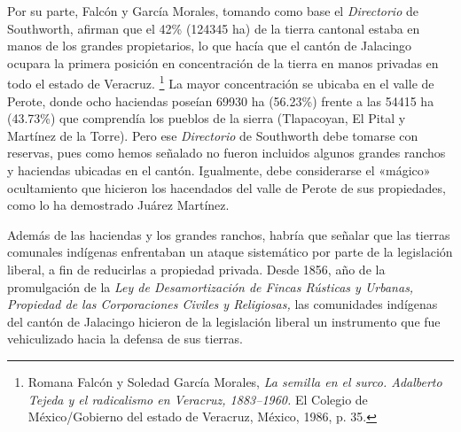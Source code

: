 \documentclass[14pt,twoside,final]{extbook} %
\let\oldfootnote\footnote
\renewcommand\footnote[1]{%
\oldfootnote{\hspace{1mm}#1}}
\begin{document}
Por su parte, Falcón y García Morales, tomando como base el \emph{Directorio} de Southworth, afirman que el 42\% (124345 ha) de la tierra cantonal estaba en manos de los grandes propietarios, lo que hacía que el cantón de Jalacingo ocupara la primera posición en concentración de la tierra en manos privadas en todo el estado de Veracruz.\footnote{Romana Falcón y Soledad García Morales, \emph{La semilla en el surco. Adalberto Tejeda y el radicalismo en Veracruz, 1883--1960.} El Colegio de México/Gobierno del estado de Veracruz, México, 1986, p. 35.} La mayor concentración se ubicaba en el valle de Perote, donde ocho haciendas poseían 69930 ha (56.23\%) frente a las 54415 ha (43.73\%) que comprendía los pueblos de la sierra (Tlapacoyan, El Pital y Martínez de la Torre). Pero ese \emph{Directorio} de Southworth debe tomarse con reservas, pues como hemos señalado no fueron incluidos algunos grandes ranchos y haciendas ubicadas en el cantón. Igualmente, debe considerarse el «mágico» ocultamiento que hicieron los hacendados del valle de Perote de sus propiedades, como lo ha demostrado Juárez Martínez.

Además de las haciendas y los grandes ranchos, habría que señalar que las tierras comunales indígenas enfrentaban un ataque sistemático por parte de la legislación liberal, a fin de reducirlas a propiedad privada. Desde 1856, año de la promulgación de la \emph{Ley de Desamortización de Fincas Rústicas y Urbanas, Propiedad de las Corporaciones Civiles y Religiosas,} las comunidades indígenas del cantón de Jalacingo hicieron de la legislación liberal un instrumento que fue vehiculizado hacia la defensa de sus tierras.
\end{document}
